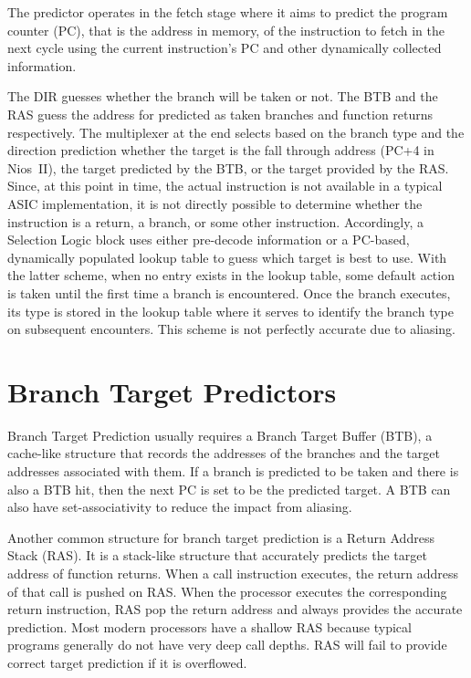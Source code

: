 The predictor operates in the fetch stage where it aims to predict the program counter (PC), that is the address in memory, of the instruction to fetch in the next cycle using the current instruction's PC and other dynamically collected information. 

The DIR guesses whether the branch will be taken or not. The BTB and the RAS guess the address for  predicted as taken branches and function returns respectively. The multiplexer at the end selects based on the branch type and the direction prediction whether the target is the fall through address (PC+4 in Nios~II), the target predicted by the BTB, or the target provided by the RAS. Since, at this point in time, the actual instruction is not available in a typical ASIC implementation, it is not directly possible to determine whether the instruction is a return, a branch, or some other instruction. Accordingly, a Selection Logic block uses either pre-decode information or a PC-based, dynamically populated lookup table to guess which target is best to use. With the latter scheme, when no entry exists in the lookup table, some default action is taken until the first time a branch is encountered. Once the branch executes, its type is stored in the lookup table where it serves to identify the branch type on subsequent encounters. This scheme is not perfectly accurate due to aliasing.

\section{Branch Target Predictors}
\label{sec:background:target}
Branch Target Prediction usually requires a Branch Target Buffer (BTB), a cache-like structure that records the addresses of the branches and the target addresses associated with them. If a branch is predicted to be taken and there is also a BTB hit, then the next PC is set to be the predicted target. A BTB can also have set-associativity to reduce the impact from aliasing.

Another common structure for branch target prediction is a Return Address Stack (RAS). It is a stack-like structure that accurately predicts the target address of function returns. When a call instruction executes, the return address of that call is pushed on RAS. When the processor executes the corresponding return instruction, RAS pop the return address and always provides the accurate prediction. Most modern processors have a shallow RAS because typical programs generally do not have very deep call depths. RAS will fail to provide correct target prediction if it is overflowed.


